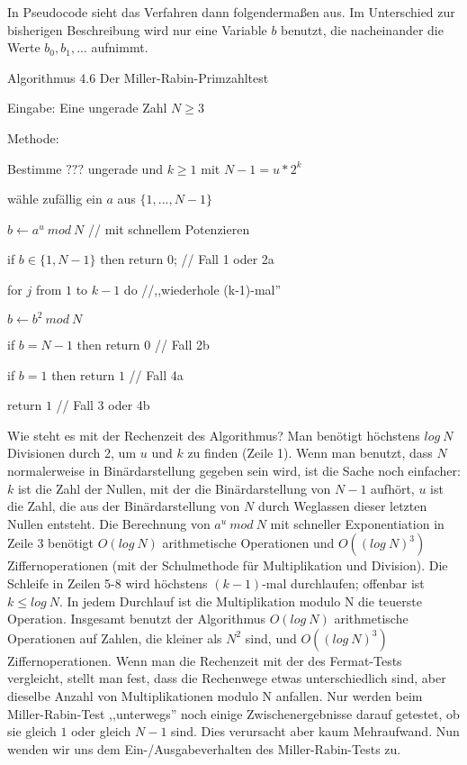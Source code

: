 \documentclass[a4paper]{article}
\begin{document}
\begin{multicols}{3}
        In Pseudocode sieht das Verfahren dann folgendermaßen aus. Im Unterschied zur bisherigen Beschreibung wird nur eine Variable $b$ benutzt, die nacheinander die Werte $b_0,b_1,...$ aufnimmt.

        Algorithmus 4.6 Der Miller-Rabin-Primzahltest
        \begin{itemize*}
            \item Eingabe: Eine ungerade Zahl $N\geq 3$
            \item Methode:
            \begin{itemize*}
                \item Bestimme $???$ ungerade und $k\geq 1$ mit $N-1 =u*2^k$
                \item wähle zufällig ein $a$ aus $\{1 ,...,N-1\}$
                \item $b \leftarrow a^u\ mod\ N$ // mit schnellem Potenzieren
                \item if $b\in\{1,N-1\}$ then return $0$; // Fall 1 oder 2a
                \item for $j$ from $1$ to $k-1$ do //,,wiederhole (k-1)-mal''
                \item $b\leftarrow b^2\ mod\ N$
                \item if $b=N-1$ then return $0$ // Fall 2b
                \item if $b=1$ then return $1$ // Fall 4a
                \item return $1$ // Fall 3 oder 4b
            \end{itemize*}
        \end{itemize*}

        Wie steht es mit der Rechenzeit des Algorithmus? Man benötigt höchstens $log\ N$ Divisionen durch 2, um $u$ und $k$ zu finden (Zeile 1). Wenn man benutzt, dass $N$ normalerweise in Binärdarstellung gegeben sein wird, ist die Sache noch einfacher: $k$ ist die Zahl der Nullen, mit der die Binärdarstellung von $N-1$ aufhört, $u$ ist die Zahl, die aus der Binärdarstellung von $N$ durch Weglassen dieser letzten Nullen entsteht. Die Berechnung von $a^u\ mod\ N$ mit schneller Exponentiation in Zeile 3 benötigt $O(log\ N)$ arithmetische Operationen und $O((log\ N)^3)$ Ziffernoperationen (mit der Schulmethode für Multiplikation und Division). Die Schleife in Zeilen 5-8 wird höchstens $(k-1)$-mal durchlaufen; offenbar ist $k\leq log\ N$. In jedem Durchlauf ist die Multiplikation modulo N die teuerste Operation. Insgesamt benutzt der Algorithmus $O(log\ N)$ arithmetische Operationen auf Zahlen, die kleiner als $N^2$ sind, und $O((log\ N)^3)$ Ziffernoperationen. Wenn man die Rechenzeit mit der des Fermat-Tests vergleicht, stellt man fest, dass die Rechenwege etwas unterschiedlich sind, aber dieselbe Anzahl von Multiplikationen modulo N anfallen. Nur werden beim Miller-Rabin-Test ,,unterwegs'' noch einige Zwischenergebnisse darauf getestet, ob sie gleich $1$ oder gleich $N-1$ sind. Dies verursacht aber kaum Mehraufwand.
        Nun wenden wir uns dem Ein-/Ausgabeverhalten des Miller-Rabin-Tests zu.


\end{multicols}
\end{document}
